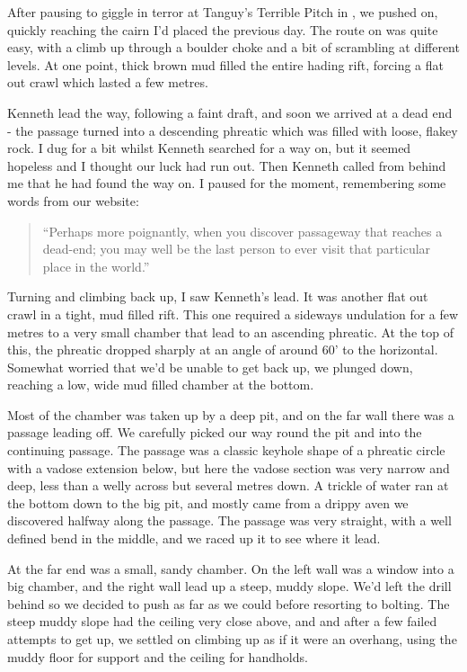 After pausing to giggle in terror at Tanguy’s Terrible Pitch in , we pushed on, quickly reaching the cairn I’d placed the previous day. The route on was quite easy, with a climb up through a boulder choke and a bit of scrambling at different levels. At one point, thick brown mud filled the entire hading rift, forcing a flat out crawl which lasted a few metres.
 
Kenneth lead the way, following a faint draft, and soon we arrived at a dead end - the passage turned into a descending phreatic which was filled with loose, flakey rock. I dug for a bit whilst Kenneth searched for a way on, but it seemed hopeless and I thought our luck had run out. Then Kenneth called from behind me that he had found the way on. I paused for the moment, remembering some words from our website: 

\begin{quote} “Perhaps more poignantly, when you discover passageway that reaches a dead-end; you may well be the last person to ever visit that particular place in the world.” \end{quote}
 
Turning and climbing back up, I saw Kenneth’s lead. It was another flat out crawl in a tight, mud filled rift. This one required a sideways undulation for a few metres to a very small chamber that lead to an ascending phreatic. At the top of this, the phreatic dropped sharply at an angle of around 60’ to the horizontal. Somewhat worried that we’d be unable to get back up, we plunged down, reaching a low, wide mud filled chamber at the bottom.
 
Most of the chamber was taken up by a deep pit, and on the far wall there was a passage leading off. We carefully picked our way round the pit and into the continuing passage. The passage was a classic keyhole shape of a phreatic circle with a vadose extension below, but here the vadose section was very narrow and deep, less than a welly across but several metres down. A trickle of water ran at the bottom down to the big pit, and mostly came from a drippy aven we discovered halfway along the passage. The passage was very straight, with a well defined bend in the middle, and we raced up it to see where it lead.
 
At the far end was a small, sandy chamber. On the left wall was a window into a big chamber, and the right wall lead up a steep, muddy slope. We’d left the drill behind so we decided to push as far as we could before resorting to bolting. The steep muddy slope had the ceiling very close above, and and after a few failed attempts to get up, we settled on climbing up as if it were an overhang, using the muddy floor for support and the ceiling for handholds.
 
